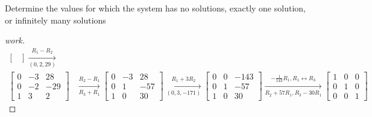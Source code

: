 \documentclass{article}
\begin{document}
\begin{question}{1.2}{Determine the values for which the system has no solutions, exactly one solution, or infinitely many solutions}
\begin{proof}[work]
\begin{align*}
\begin{bmatrix}
      \end{bmatrix} \xrightarrow[(0,2,29)]{R_1 - R_2}     \\
      \begin{bmatrix}
        0 & -3 & 28  \\
        0 & -2 & -29 \\
        1 & 3  & 2
      \end{bmatrix} & \xrightarrow[R_3 + R_1]{R_2 - R_1}
      \begin{bmatrix}
        0 & -3 & 28  \\
        0 & 1  & -57 \\
        1 & 0  & 30
      \end{bmatrix} \xrightarrow[(0,3,-171)]{R_1 + 3R_2}
      \begin{bmatrix}
        0 & 0 & -143 \\
        0 & 1 & -57  \\
        1 & 0 & 30
      \end{bmatrix} \xrightarrow[R_2+57R_1,R_3-30R_1]{-\frac{1}{143}R_1, R_1 \leftrightarrow R_3}
      \begin{bmatrix}
        1 & 0 & 0 \\
        0 & 1 & 0 \\
        0 & 0 & 1
      \end{bmatrix}
    \end{align*}
  \end{proof}
\end{question}
\end{document}
